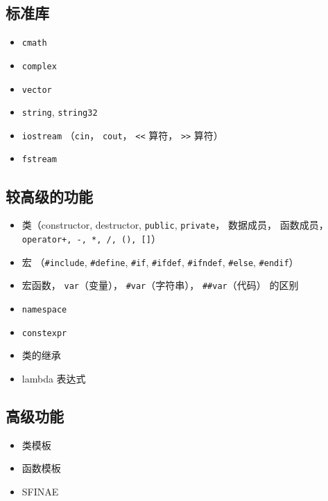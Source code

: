 \subsection{标准库}
\begin{itemize}
\item \verb|cmath|
\item \verb|complex|
\item \verb|vector|
\item \verb|string|, \verb|string32|
\item \verb|iostream| （\verb|cin|， \verb|cout|， \verb|<<| 算符， \verb|>>| 算符）
\item \verb|fstream|
\end{itemize}

\subsection{较高级的功能}
\begin{itemize}
\item 类（constructor, destructor, \verb|public|, \verb|private|， 数据成员， 函数成员， \verb|operator+, -, *, /, (), []|）
\item 宏 （\verb|#include|, \verb|#define|, \verb|#if|, \verb|#ifdef|, \verb|#ifndef|, \verb|#else|, \verb|#endif|）
\item 宏函数， \verb|var|（变量）， \verb|#var|（字符串）， \verb|##var|（代码） 的区别
\item \verb|namespace|
\item \verb|constexpr|
\item 类的继承
\item lambda 表达式
\end{itemize}

\subsection{高级功能}
\begin{itemize}
\item 类模板
\item 函数模板
\item SFINAE
\end{itemize}
